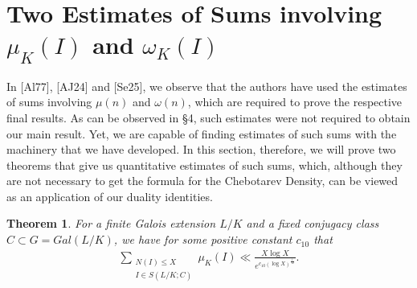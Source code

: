 \documentclass[12pt]{article}
\numberwithin{equation}{section}
\newtheorem{theorem}{Theorem}[section]
\numberwithin{equation}{section}
\begin{document}
 \section{Two Estimates of Sums involving $\mu_K(I)$ and $\omega_K(I)$}
 In [Al77], [AJ24] and [Se25], we observe that the authors have used the estimates of sums involving $\mu(n)$ and $\omega(n)$, which are required to prove the respective final results. As can be observed in \S4, such estimates were not required to obtain our main result. Yet, we are capable of finding estimates of such sums with the machinery that we have developed. In this section, therefore, we will prove two theorems that give us quantitative estimates of such sums, which, although they are not necessary to get the formula for the Chebotarev Density, can be viewed as an application of our duality identities.
 \begin{theorem}
     For a finite Galois extension $L/K$ and a fixed conjugacy class $C\subset G=Gal(L/K)$, we have for some positive constant $c_{10}$ that
     \begin{align}
         \sum_{\substack{N(I)\leq X \\ I \in S(L/K;C)}}\mu_K(I) \ll \frac{X\log X}{e^{c_{10}(\log X)^{\frac{1}{12}}}}. \nonumber
     \end{align}
 \end{theorem}
\end{document}
